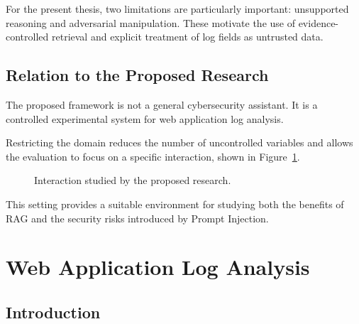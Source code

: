 For the present thesis, two limitations are particularly important:
unsupported reasoning and adversarial manipulation. These motivate the
use of evidence-controlled retrieval and explicit treatment of log
fields as untrusted data.

\subsection{Relation to the Proposed
Research}\label{relation-to-the-proposed-research}

The proposed framework is not a general cybersecurity assistant. It is a
controlled experimental system for web application log analysis.

Restricting the domain reduces the number of uncontrolled variables and
allows the evaluation to focus on a specific interaction, shown in
Figure~\ref{fig:proposed-research-interaction}.

\begin{figure}[H]
  \centering
  \caption{Interaction studied by the proposed research.}
  \label{fig:proposed-research-interaction}
\end{figure}

This setting provides a suitable environment for studying both the
benefits of RAG and the security risks introduced by Prompt Injection.

\section{Web Application Log
Analysis}\label{web-application-log-analysis}

\subsection{Introduction}\label{web-log-analysis-introduction}


